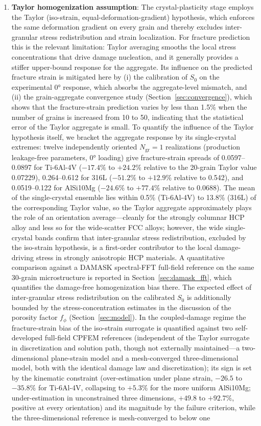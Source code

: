 \documentclass[twocolumn]{sagej}
\begin{document}
\begin{enumerate}
    \item \textbf{Taylor homogenization assumption}: The crystal-plasticity stage employs the Taylor (iso-strain, equal-deformation-gradient) hypothesis, which enforces the same deformation gradient on every grain and thereby excludes inter-granular stress redistribution and strain localization. For fracture prediction this is the relevant limitation: Taylor averaging smooths the local stress concentrations that drive damage nucleation, and it generally provides a stiffer upper-bound response for the aggregate. Its influence on the predicted fracture strain is mitigated here by (i) the calibration of $S_0$ on the experimental $\ang{0}$ response, which absorbs the aggregate-level mismatch, and (ii) the grain-aggregate convergence study (Section~\ref{sec:convergence}), which shows that the fracture-strain prediction varies by less than 1.5\% when the number of grains is increased from 10 to 50, indicating that the statistical error of the Taylor aggregate is small. To quantify the influence of the Taylor hypothesis itself, we bracket the aggregate response by its single-crystal extremes: twelve independently oriented $N_{\mathrm{gr}}=1$ realizations (production leakage-free parameters, $\ang{0}$ loading) give fracture-strain spreads of 0.0597--0.0897 for Ti-6Al-4V ($-17.4\%$ to $+24.2\%$ relative to the 20-grain Taylor value 0.07229), 0.264--0.612 for 316L ($-51.2\%$ to $+12.9\%$ relative to 0.542), and 0.0519--0.122 for AlSi10Mg ($-24.6\%$ to $+77.4\%$ relative to 0.0688). The mean of the single-crystal ensemble lies within 0.5\% (Ti-6Al-4V) to 13.8\% (316L) of the corresponding Taylor value, so the Taylor aggregate approximately plays the role of an orientation average---cleanly for the strongly columnar HCP alloy and less so for the wide-scatter FCC alloys; however, the wide single-crystal bands confirm that inter-granular stress redistribution, excluded by the iso-strain hypothesis, is a first-order contributor to the local damage-driving stress in strongly anisotropic HCP materials. A quantitative comparison against a DAMASK spectral-FFT full-field reference on the same 30-grain microstructure is reported in Section~\ref{sec:damask_fft}, which quantifies the damage-free homogenization bias there. The expected effect of inter-granular stress redistribution on the calibrated $S_0$ is additionally bounded by the stress-concentration estimates in the discussion of the porosity factor $f_\phi$ (Section~\ref{sec:model}). In the coupled-damage regime the fracture-strain bias of the iso-strain surrogate is quantified against two self-developed full-field CPFEM references (independent of the Taylor surrogate in discretization and solution path, though not externally maintained---a two-dimensional plane-strain model and a mesh-converged three-dimensional model, both with the identical damage law and discretization); its sign is set by the kinematic constraint (over-estimation under plane strain, $-26.5$ to $-35.8\%$ for Ti-6Al-4V, collapsing to $+5.3\%$ for the more uniform AlSi10Mg; under-estimation in unconstrained three dimensions, $+49.8$ to $+92.7\%$, positive at every orientation) and its magnitude by the failure criterion, while the three-dimensional reference is mesh-converged to below one 
\end{enumerate}
\end{document}
